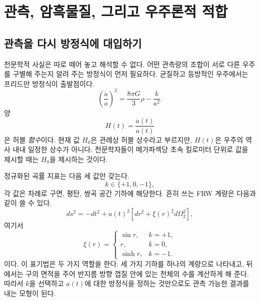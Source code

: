 \chapter{관측, 암흑물질, 그리고 우주론적 적합}


\section{관측을 다시 방정식에 대입하기}

천문학적 사실은 따로 떼어 놓고 해석할 수 없다. 어떤 관측량의 조합이 서로 다른 우주를 구별해 주는지 알려 주는 방정식이 먼저 필요하다. 균질하고 등방적인 우주에서는 프리드만 방정식이 출발점이다.
\begin{equation}
\left(\frac{\dot a}{a}\right)^2
=
\frac{8\pi G}{3}\rho-\frac{k}{a^2}.
\label{eq:c06-friedmann}
\end{equation}
양
\begin{equation}
H(t)=\frac{\dot a(t)}{a(t)}
\label{eq:c06-hubble}
\end{equation}은 허블 \emph{함수}이다. 현재 값 \(H_0\)은 관례상 허블 상수라고 부르지만, \(H(t)\)은 우주의 역사 내내 일정한 상수가 아니다. 천문학자들이 메가파섹당 초속 킬로미터 단위로 값을 제시할 때는 \(H_0\)을 제시하는 것이다.

정규화된 곡률 지표는 다음 세 값만 갖는다.
\begin{equation}
k\in\{+1,0,-1\},
\end{equation}
각 값은 차례로 구면, 평탄, 쌍곡 공간 기하에 해당한다. 흔히 쓰는 FRW 계량은 다음과 같이 쓸 수 있다.
\begin{equation}
ds^2=-dt^2+a(t)^2\left[dr^2+\xi(r)^2d\Omega_2^2\right],
\label{eq:c06-frw}
\end{equation}
여기서
\begin{equation}
\xi(r)=
\begin{cases}
\sin r, & k=+1,\\
r, & k=0,\\
\sinh r, & k=-1.
\end{cases}
\label{eq:c06-xi}
\end{equation}
이다. 이 표기법은 두 가지 역할을 한다. 세 가지 기하를 하나의 계량으로 나타내고, 뒤에서는 구의 면적을 주어 반지름 방향 껍질 안에 있는 천체의 수를 계산하게 해 준다. 따라서 \(k\)을 선택하고 \(a(t)\)에 대한 방정식을 정하는 것만으로도 관측 가능한 결과를 내는 모형이 된다.

